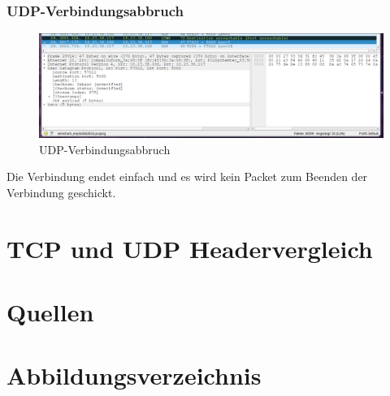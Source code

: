 \documentclass[a4paper]{article}
\begin{document}
\subsubsection{UDP-Verbindungsabbruch}
\begin{figure}[h]
	\includegraphics[scale=0.3]{images/udpverbindungsaufbau.png}
	\caption{UDP-Verbindungsabbruch}
\end{figure}
Die Verbindung endet einfach und es wird kein Packet zum Beenden der Verbindung geschickt.
\section{TCP und UDP Headervergleich}



\newpage
\section{Quellen}

\newpage
\section{Abbildungsverzeichnis}

\listoffigures
\end{document}
